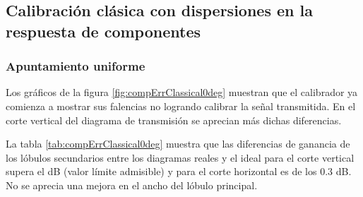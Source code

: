 \subsection{Calibración clásica con dispersiones en la respuesta de componentes}
\label{ssc:classicalDispersion}

\subsubsection{Apuntamiento uniforme}

Los gráficos de la figura \ref{fig:compErrClassical0deg} muestran que el calibrador ya comienza a mostrar sus falencias no 
logrando calibrar la señal transmitida. En el corte vertical del diagrama de transmisión se aprecian más dichas diferencias.

La tabla \ref{tab:compErrClassical0deg} muestra que las diferencias de ganancia de los lóbulos secundarios entre los diagramas 
reales y el ideal para el corte vertical supera el dB (valor límite admisible) y para el corte horizontal es de los 0.3 dB. No 
se aprecia una mejora en el ancho del lóbulo principal.
